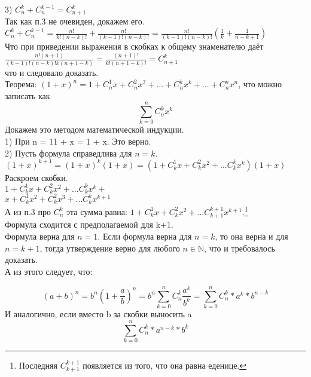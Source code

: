 \documentclass[a4paper,12pt]{article} %
\begin{document}
3) $C_{n}^k + C_n^{k-1} = C_{n+1}^k$\\
Так как п.3 не очевиден, докажем его.\\
$C_{n}^k+C_n^{k-1}=\frac{n!}{k!(n-k)!}+\frac{n!}{(k-1)!(n-k)!}=\frac{n!}{(k-1)!(n-k)!}\left(\frac{1}{k} + \frac{1}{n-k+1}\right)$\\
Что при приведении выражения в скобках к общему знаменателю даёт\\
$\frac{n!(n+1)}{(k-1)!(n-k)!k(n+1-k)}=\frac{(n+1)!}{k!(n+1-k)!}=C_{n+1}^k$\\
что и следовало доказать.\\[1cm]
Теорема:
$(1+x)^n=1+C_{n}^1x + C_{n}^2x^2 +... + C_{n}^kx^k + ... + C_{n}^nx^n$, что можно записать как
\[\sum_{k=0}^{n}C_{n}^kx^k\]
Докажем это методом математической индукции.\\
1) При n = 1\hspace{50pt}1 + x = 1 + x. \hspace{50pt} Это верно.\\
2) Пусть формула справедлива для $n=k$.\\
$(1+x)^{k+1}=(1+x)^k(1+x)=\left(1+C_{k}^1x+C_{k}^2x^2+...C_{k}^kx^k\right)(1+x)$\\
Раскроем скобки.\\
$1+C_{k}^1x+C_{k}^2x^2+...C_{k}^kx^k+$\\
$x+C_{k}^1x^2+C_{k}^2x^3+...C_{k}^kx^{k+1}$\\
А из п.3 про $C_{n}^k$ эта сумма равна:
$1 + C_{k}^1x + C_{k}^2x^2+...C_{k+1}^{k+1}x^{k+1}$.\footnote{Последняя $C_{k+1}^{k+1}$ появляется из того, что она равна еденице.}\\
Формула сходится с предполагаемой для k+1.\\
Формула верна для $n = 1$. Если формула верна для $n=k$, то она верна и для $n=k+1$, тогда утверждение верно для любого $n\in\mathbb{N}$, что и требовалось доказать.\\
А из этого следует, что:

\[(a+b)^n = b^n(1+\frac{a}{b})^n = b^n\sum^n_{k=0}C_{n}^k\frac{a^k}{b^k}=\sum_{k=0}^nC_{n}^k*a^k*b^{n-k}\]
И аналогично, если вместо b за скобки выносить a
\[\sum_{k=0}^nC_{n}^k*a^{n - k}*b^k\]
\end{document}
